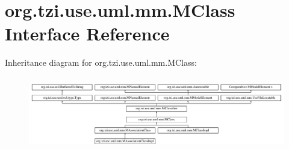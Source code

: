 \hypertarget{interfaceorg_1_1tzi_1_1use_1_1uml_1_1mm_1_1_m_class}{\section{org.\-tzi.\-use.\-uml.\-mm.\-M\-Class Interface Reference}
\label{interfaceorg_1_1tzi_1_1use_1_1uml_1_1mm_1_1_m_class}
}
Inheritance diagram for org.\-tzi.\-use.\-uml.\-mm.\-M\-Class\-:\begin{figure}[H]
\begin{center}
\leavevmode
\includegraphics[height=3.268482cm]{interfaceorg_1_1tzi_1_1use_1_1uml_1_1mm_1_1_m_class}
\end{center}
\end{figure}
